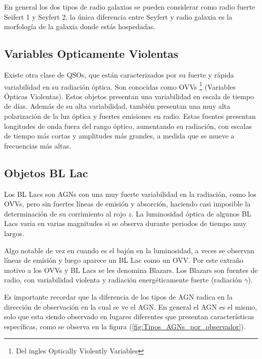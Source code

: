 En general los dos tipos de radio galaxias se pueden considerar como radio fuerte Seifert 1 y Seyfert 2, la única diferencia entre Seyfert y radio galaxia es la morfología de la galaxia donde estás hospedadas. 

	\subsection{Variables Opticamente Violentas}
	\label{subsec:Optically_Violently_Variables}

Existe otra clase de QSOs, que están caracterizados por su fuerte y rápida variabilidad en su radiación óptica. Son conocidas como OVVs \footnote{Del ingles Optically Violently Variables } (Variables Ópticas Violentas). Estos objetos presentan una variabilidad en escala de tiempo de días. Además de su alta variabilidad, también presentan una muy alta polarización de la luz óptica y fuertes emisiones en radio. Estas fuentes presentan longitudes de onda fuera del rango óptico, aumentando su radiación, con escalas de tiempo más cortas y amplitudes más grandes, a medida que se mueve a frecuencias más altas.  

	\subsection{Objetos BL Lac}
	\label{subsec:BL_Lac}

Los BL Lacs son AGNs con una muy fuerte variabilidad en la radiación, como los OVVs, pero sin fuertes líneas de emisión y absorción, haciendo casi imposible la determinación de su corrimiento al rojo $z$. La luminosidad óptica de algunos BL Lacs varia en varias magnitudes si se observa durante periodos de tiempo muy largos.

Algo notable de vez en cuando es el bajón en la luminosidad, a veces se observan líneas de emisión y luego aparece un BL Lac como un OVV. Por este extraño motivo a los OVVs y BL Lacs se les denomina Blazars. Los Blazars son fuentes de radio, con variabilidad violenta y radiación energéticamente fuerte (radiación $\gamma$).


Es importante recordar que la diferencia de los tipos de AGN radica en la dirección de observación en la cual se ve el AGN. En general el AGN es el mismo, solo que esta siendo observado en lugares diferentes que presentan características específicas, como se observa en la figura (\ref{fig:Tipos_AGNs_por_observador}). 

